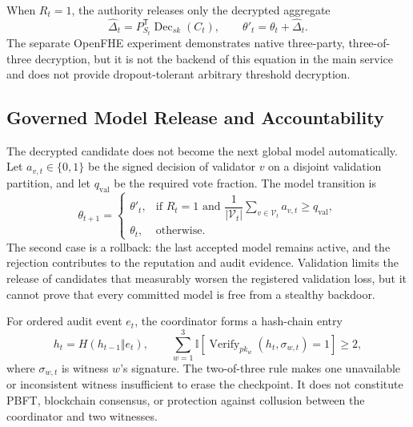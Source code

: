 When $R_t=1$, the authority releases only the decrypted aggregate
\begin{equation}
    \widehat{\Delta}_t=P_{S_t}^{\mathsf T}\operatorname{Dec}_{sk}(C_t),
    \qquad
    \theta'_t=\theta_t+\widehat{\Delta}_t.
    \label{eq:candidate-global-model}
\end{equation}
The separate OpenFHE experiment demonstrates native three-party, three-of-three decryption, but it is not the backend of this equation in the main service and does not provide dropout-tolerant arbitrary threshold decryption.

\subsection{Governed Model Release and Accountability}
\label{subsec:problem-release-governance}

The decrypted candidate does not become the next global model automatically. Let $a_{v,t}\in\{0,1\}$ be the signed decision of validator $v$ on a disjoint validation partition, and let $q_{\mathrm{val}}$ be the required vote fraction. The model transition is
\begin{equation}
    \theta_{t+1}=
    \begin{cases}
        \theta'_t,
        & \text{if }R_t=1\text{ and }
          \dfrac{1}{|\mathcal{V}_t|}\sum_{v\in\mathcal{V}_t}a_{v,t}
          \geq q_{\mathrm{val}},\\[2mm]
        \theta_t, & \text{otherwise.}
    \end{cases}
    \label{eq:governed-model-transition}
\end{equation}
The second case is a rollback: the last accepted model remains active, and the rejection contributes to the reputation and audit evidence. Validation limits the release of candidates that measurably worsen the registered validation loss, but it cannot prove that every committed model is free from a stealthy backdoor.

For ordered audit event $e_t$, the coordinator forms a hash-chain entry
\begin{equation}
    h_t=H(h_{t-1}\Vert e_t),
    \qquad
    \sum_{w=1}^{3}\mathbb{I}
    [\operatorname{Verify}_{pk_w}(h_t,\sigma_{w,t})=1]\geq2,
    \label{eq:audit-witness-condition}
\end{equation}
where $\sigma_{w,t}$ is witness $w$'s signature. The two-of-three rule makes one unavailable or inconsistent witness insufficient to erase the checkpoint. It does not constitute PBFT, blockchain consensus, or protection against collusion between the coordinator and two witnesses.

